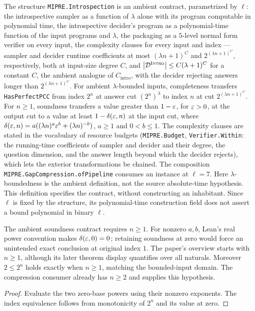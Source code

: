 \begin{definition}
\label{def:introspection-contract}
\leanok
The structure \texttt{MIPRE.Introspection} is an ambient contract,
parametrized by $\ell$: the introspective sampler as a function of $\lambda$ alone with its
program computable in polynomial time, the introspective decider's program as a
polynomial-time function of the input programs and $\lambda$, the packaging as a $5$-level
normal form verifier on every input, the complexity clauses for every input and index ---
sampler and decider runtime coefficients at most $(\lambda n + 1)^C$ and
$2^{(\lambda n + 1)^C}$, respectively, both at input-size degree $C$, and
$\left\vert {\mathcal{D}^{\textsc{Intro}}} \right\vert \leq C(\lambda + 1)^C$ for a constant $C$, the ambient analogue of
$C_{\mathrm{intro}}$, with
the decider rejecting answers longer than $2^{(\lambda n+1)^C}$. For ambient
$\lambda$-bounded inputs, completeness transfers \texttt{HasPerfectPCC} from index
$2^n$ at answer cut $(2^n)^\lambda$ to index $n$ at cut $2^{(\lambda n+1)^C}$.
For $n\geq1$, soundness transfers a value greater than $1-\varepsilon$, for $\varepsilon>0$, at the output cut
to a value at least $1-\delta(\varepsilon,n)$ at the input cut, where
$\delta(\varepsilon,n)=a((\lambda n)^a\varepsilon^b+(\lambda n)^{-b})$, $a\geq1$ and $0<b\leq1$.
The complexity clauses are stated in the
vocabulary of resource budgets (\texttt{MIPRE.Budget}, \texttt{Verifier.Within}: the running-time
coefficients of sampler and decider and their degree, the question dimension, and the answer
length beyond which the decider rejects), which lets the exterior transformations be
chained. The composition \texttt{MIPRE.GapCompression.ofPipeline} consumes an instance at
$\ell = 7$. Here $\lambda$-boundedness is the ambient definition, not the source
absolute-time hypothesis. This definition specifies the contract, without constructing
an inhabitant. Since $\ell$ is fixed by the structure, its polynomial-time construction
field does not assert a bound polynomial in binary $\ell$.
\end{definition}

\begin{remark}
\label{rem:introspection-positive-index}
\leanok
The ambient soundness contract requires $n\geq1$. For nonzero $a,b$, Lean's real
power convention makes $\delta(\varepsilon,0)=0$; retaining soundness at zero would force
an unintended exact conclusion at original index $1$. The paper's overview starts
with $n\geq1$, although its later theorem display quantifies over all naturals.
Moreover $2\leq2^n$ holds exactly when $n\geq1$, matching the bounded-input domain.
The compression consumer already has $n\geq2$ and supplies this hypothesis.
\end{remark}
\begin{proof}
\leanok
Evaluate the two zero-base powers using their nonzero exponents. The index
equivalence follows from monotonicity of $2^n$ and its value at zero.
\end{proof}

